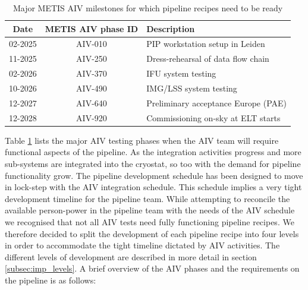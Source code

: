 \documentclass[a4paper]{spie}  %
\begin{document}
\begin{table}[]
    \centering
\caption{Major METIS AIV milestones for which pipeline recipes need to be ready}
\label{tab:dev_aiv_milestones}
    \begin{tabular}{c|c|l}
    \hline
    \hline
         Date &   METIS AIV phase ID & Description\\
         \hline
         02-2025 &   AIV-010&PIP workstation setup in Leiden\\
         11-2025 &   AIV-250&Dress-rehearsal of data flow chain\\
 02-2026 & AIV-370&IFU system testing\\
 10-2026 &  AIV-490&IMG/LSS system testing\\
 12-2027 & AIV-640&Preliminary acceptance Europe (PAE)\\
 12-2028 & AIV-920&Commissioning on-sky at ELT starts\\
 \hline
 \end{tabular}
      
\end{table}

Table \ref{tab:dev_aiv_milestones} lists the major AIV testing phases when the AIV team will require functional aspects of the pipeline. 
As the integration activities progress and more sub-systems are integrated into the cryostat, so too with the demand for pipeline functionality grow. 
The pipeline development schedule has been designed to move in lock-step with the AIV integration schedule.
This schedule implies a very tight development timeline for the pipeline team.
While attempting to reconcile the available person-power in the pipeline team with the needs of the AIV schedule we recognised that not all AIV tests need fully functioning pipeline recipes. 
We therefore decided to split the development of each pipeline recipe into four levels in order to accommodate the tight timeline dictated by AIV activities.
The different levels of development are described in more detail in section \ref{subsec:imp_levels}.
A brief overview of the AIV phases and the requirements on the pipeline is as follows:
\end{document}
